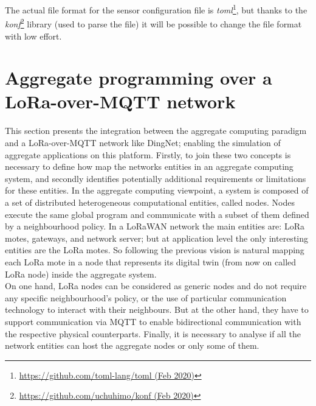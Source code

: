 % 
The actual file format for the sensor configuration file is \textit{toml}\footnote{\href{https://github.com/toml-lang/toml}{https://github.com/toml-lang/toml (Feb 2020)}}, but thanks to the \textit{konf}\footnote{\href{https://github.com/uchuhimo/konf}{https://github.com/uchuhimo/konf (Feb 2020)}} library (used to parse the file) it will be possible to change the file format with low effort.



\section{Aggregate programming over a LoRa-over-MQTT network}
\label{sec:contributionACOverDingNet}
This section presents the integration between the aggregate computing paradigm and a LoRa-over-MQTT network like DingNet; enabling the simulation of aggregate applications on this platform.
Firstly, to join these two concepts is necessary to define how map the networks entities in an aggregate computing system, and secondly identifies potentially additional requirements or limitations for these entities.
In the aggregate computing viewpoint, a system is composed of a set of distributed heterogeneous computational entities, called nodes. Nodes execute the same global program and communicate with a subset of them defined by a neighbourhood policy. 
In a LoRaWAN network the main entities are: LoRa motes, gateways, and network server; but at application level the only interesting entities are the LoRa motes.
So following the previous vision is natural mapping each LoRa mote in a node that represents its digital twin (from now on called LoRa node) inside the aggregate system.
\\On one hand, LoRa nodes can be considered as generic nodes and do not require any specific neighbourhood's policy, or the use of particular communication technology to interact with their neighbours. 
But at the other hand, they have to support communication via MQTT to enable bidirectional communication with the respective physical counterparts.
Finally, it is necessary to analyse if all the network entities can host the aggregate nodes or only some of them.
